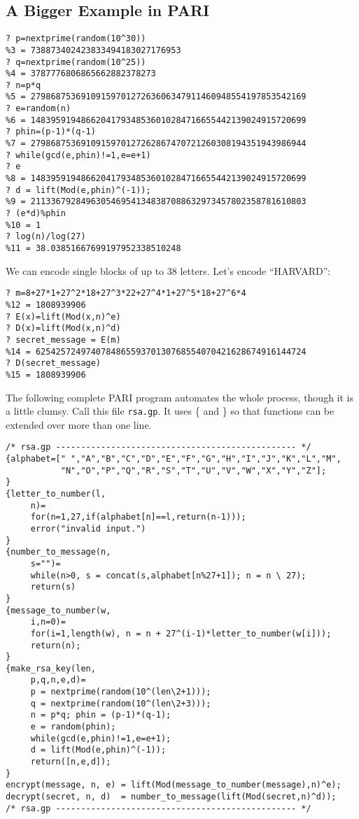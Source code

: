 \documentclass[11pt]{report}
\begin{document}
\subsection{A Bigger Example in PARI}
\begin{verbatim}
? p=nextprime(random(10^30))
%3 = 738873402423833494183027176953
? q=nextprime(random(10^25))
%4 = 3787776806865662882378273
? n=p*q
%5 = 2798687536910915970127263606347911460948554197853542169
? e=random(n)
%6 = 1483959194866204179348536010284716655442139024915720699
? phin=(p-1)*(q-1)
%7 = 2798687536910915970127262867470721260308194351943986944
? while(gcd(e,phin)!=1,e=e+1)
? e
%8 = 1483959194866204179348536010284716655442139024915720699
? d = lift(Mod(e,phin)^(-1));
%9 = 2113367928496305469541348387088632973457802358781610803
? (e*d)%phin
%10 = 1
? log(n)/log(27)
%11 = 38.03851667699197952338510248
\end{verbatim}
We can encode single blocks of up to 38 letters.  Let's encode
``HARVARD'':
\begin{verbatim}
? m=8+27*1+27^2*18+27^3*22+27^4*1+27^5*18+27^6*4
%12 = 1808939906
? E(x)=lift(Mod(x,n)^e)
? D(x)=lift(Mod(x,n)^d)
? secret_message = E(m)
%14 = 625425724974078486559370130768554070421628674916144724
? D(secret_message)
%15 = 1808939906
\end{verbatim}

The following complete PARI program automates the whole
process, though it is a little clumsy.
Call this file {\tt rsa.gp}.  It uses \{ and \} so that
functions can be extended over more than one line.
\begin{verbatim}
/* rsa.gp ------------------------------------------------ */
{alphabet=[" ","A","B","C","D","E","F","G","H","I","J","K","L","M",
           "N","O","P","Q","R","S","T","U","V","W","X","Y","Z"];
}
{letter_to_number(l, 
     n)=
     for(n=1,27,if(alphabet[n]==l,return(n-1))); 
     error("invalid input.")
}
{number_to_message(n,    
     s="")= 
     while(n>0, s = concat(s,alphabet[n%27+1]); n = n \ 27); 
     return(s)
}
{message_to_number(w,     
     i,n=0)=
     for(i=1,length(w), n = n + 27^(i-1)*letter_to_number(w[i]));
     return(n);
}
{make_rsa_key(len,  
     p,q,n,e,d)=
     p = nextprime(random(10^(len\2+1)));
     q = nextprime(random(10^(len\2+3)));
     n = p*q; phin = (p-1)*(q-1);
     e = random(phin);
     while(gcd(e,phin)!=1,e=e+1);
     d = lift(Mod(e,phin)^(-1));
     return([n,e,d]);
}
encrypt(message, n, e) = lift(Mod(message_to_number(message),n)^e);
decrypt(secret, n, d)  = number_to_message(lift(Mod(secret,n)^d));
/* rsa.gp ------------------------------------------------ */
\end{verbatim}
\end{document}
